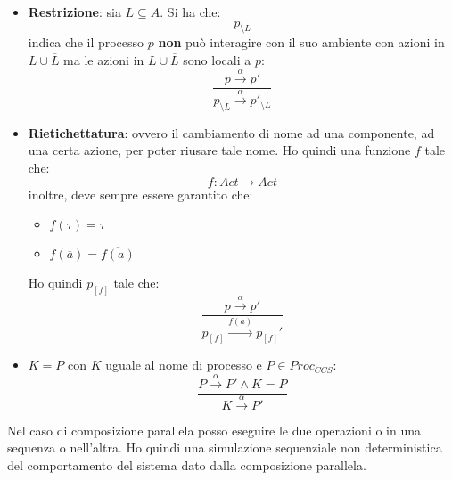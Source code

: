 \begin{itemize}
\begin{center}
          \end{center}
    \item \textbf{Restrizione}: sia $L \subseteq A$. Si ha che:
          \begin{equation}
              p_{\setminus L}
          \end{equation}
          indica che il processo $p$ \textbf{non} può interagire con il suo
          ambiente con azioni in $L \cup \overline{L}$ ma le azioni in
          $L \cup \overline{L}$ sono locali a $p$:
          \begin{equation}
              \frac{p \xrightarrow{\alpha} p'}{ p_{\setminus L}
              \xrightarrow{\alpha} p'_{\setminus L}}
          \end{equation}
    \item \textbf{Rietichettatura}: ovvero il cambiamento di nome ad una componente,
          ad una certa azione, per poter riusare tale nome. Ho quindi una
          funzione $f$ tale che:
          \begin{equation}
              f: Act \to Act
          \end{equation}
          inoltre, deve sempre essere garantito che:
          \begin{itemize}
              \item $f(\tau) = \tau$
              \item $f(\overline{a}) = \overline{f(a)}$
          \end{itemize}
          Ho quindi $p_{[f]}$ tale che:
          \begin{equation}
              \frac{p \xrightarrow{\alpha} p'}{p_{[f]} \xrightarrow{f(a)} p_{[f]}'}
          \end{equation}
    \item $K = P$ con $K$ uguale al nome di processo e $P \in Proc_{CCS}$:
          \begin{equation}
              \frac{P \xrightarrow{\alpha} P' \land K = P}{K \xrightarrow{\alpha} P'}
          \end{equation}
\end{itemize}
Nel caso di composizione parallela posso eseguire le due operazioni o in una
sequenza o nell'altra. Ho quindi una simulazione sequenziale non deterministica
del comportamento del sistema dato dalla composizione parallela.


